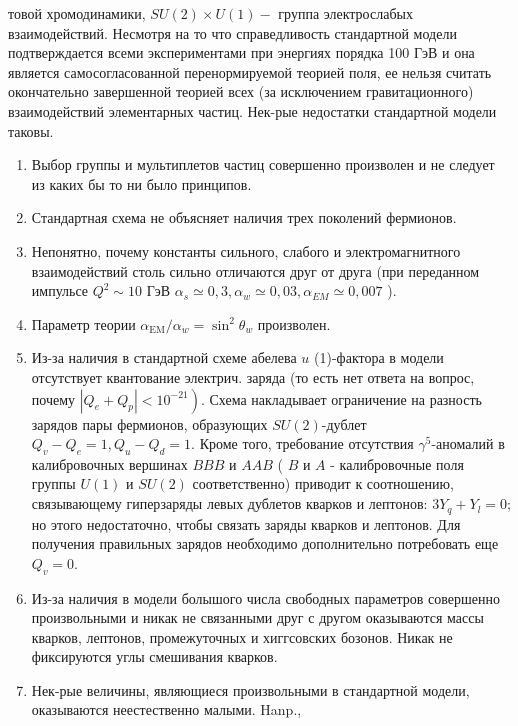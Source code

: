 \documentclass[10pt]{article}
\begin{document}
товой хромодинамики, $S U(2) \times U(1)-$ группа электрослабых взаимодействий. Несмотря на то что справедливость стандартной модели подтверждается всеми экспериментами при энергиях порядка 100 ГэВ и она является самосогласованной перенормируемой теорией поля, ее нельзя считать окончательно завершенной теорией всех (за исключением гравитационного) взаимодействий элементарных частиц. Нек-рые недостатки стандартной модели таковы.



\begin{enumerate}

  \item Выбор группы и мультиплетов частиц совершенно произволен и не следует из каких бы то ни было принципов.



  \item Стандартная схема не объясняет наличия трех поколений фермионов.



  \item Непонятно, почему константы сильного, слабого и электромагнитного взаимодействий столь сильно отличаются друг от друга (при переданном импульсе $Q^{2} \sim 10$ ГэВ $\alpha_{s} \simeq 0,3, \alpha_{w} \simeq 0,03, \alpha_{E M} \simeq 0,007$ ).



  \item Параметр теории $\alpha_{\mathrm{EM}} / \alpha_{w}=\sin ^{2} \theta_{w}$ произволен.



  \item Из-за наличия в стандартной схеме абелева $u$ (1)-фактора в модели отсутствует квантование электрич. заряда (то есть нет ответа на вопрос, почему $\left.\left|Q_{e}+Q_{p}\right|<10^{-21}\right)$. Схема накладывает ограничение на разность зарядов пары фермионов, образующих $S U(2)$-дублет $Q_{v}-Q_{e}=1, Q_{u}-Q_{d}=1$. Кроме того, требование отсутствия $\gamma^{5}$-аномалий в калибровочных вершинах $B B B$ и $A A B$ ( $B$ и $A$ - калибровочные поля группы $U(1)$ и $S U(2)$ соответственно) приводит к соотношению, связывающему гиперзаряды левых дублетов кварков и лептонов: $3 Y_{q}+Y_{l}=0$; но этого недостаточно, чтобы связать заряды кварков и лептонов. Для получения правильных зарядов необходимо дополнительно потребовать еще $Q_{v}=0$.



  \item Из-за наличия в модели болышого числа свободных параметров совершенно произвольными и никак не связанными друг с другом оказываются массы кварков, лептонов, промежуточных и хиггсовских бозонов. Никак не фиксируются углы смешивания кварков.



  \item Нек-рые величины, являющиеся произвольными в стандартной модели, оказываются неестественно малыми. Hanp.,



\end{enumerate}
\end{document}
